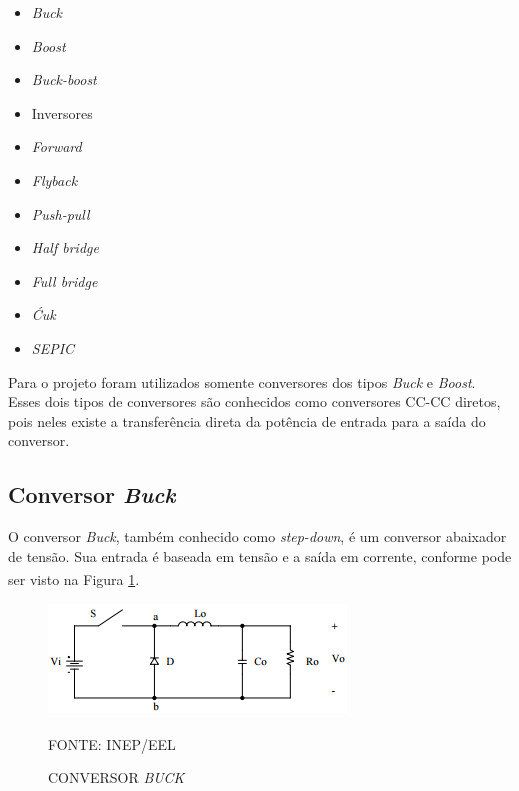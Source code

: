 \documentclass[
	12pt,				%
	openright,			%
	oneside,			%
	a4paper,			%
	english,			%
	french,				%
	spanish,			%
	brazil,				%
	oldfontcommands
	]{abntex2}
\begin{document}
	\begin{minipage}{7cm}
		\begin{itemize}
			\item	\textit{Buck}
			\item	\textit{Boost}
			\item	\textit{Buck-boost}
			\item	Inversores
			\item	\textit{Forward}
			\item	\textit{Flyback}
	\end{itemize}
	\end{minipage}
	\begin{minipage}{7cm}
		\begin{itemize}
			\item	\textit{Push-pull}
			\item	\textit{Half bridge}
			\item	\textit{Full bridge}
			\item	\textit{Ćuk}
			\item	\textit{SEPIC}
		\end{itemize}
	\end{minipage}

	Para o projeto foram utilizados somente conversores dos tipos \textit{Buck} e \textit{Boost}. Esses dois tipos de conversores são conhecidos como conversores CC-CC diretos, pois neles existe a transferência direta da potência de entrada para a saída do conversor.
	
\subsection[Conversor Buck]{Conversor \textit{Buck}}

	O conversor \textit{Buck}, também conhecido como \textit{step-down}, é um conversor abaixador de tensão. Sua entrada é baseada em tensão e a saída em corrente, conforme pode ser visto na Figura \ref{Fig_buck}.\textsuperscript{\cite{inep}}
	
 	\begin{figure}[th]
		\caption{CONVERSOR \textit{BUCK}}
		\label{Fig_buck}
		\centering
		\includegraphics[width=0.75\linewidth]{./figs/buck}
			
		\begin{small}
			FONTE: INEP/EEL\textsuperscript{\cite{inep}}
		\end{small}		
	\end{figure}
\end{document}
